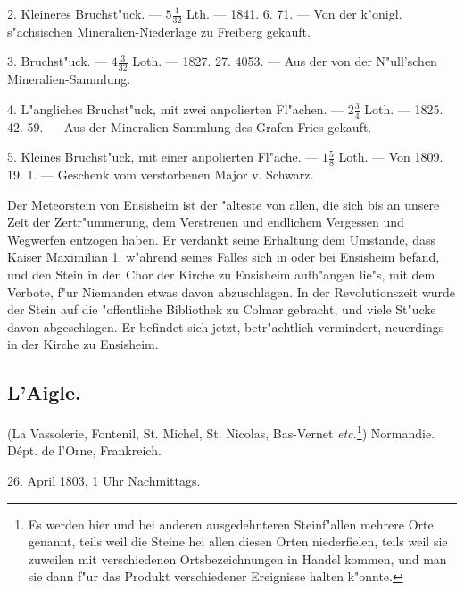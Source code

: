 \documentclass[a4paper, 11pt, oneside, polutonikogreek, german]{article}
\begin{document}
2. Kleineres Bruchst"uck. --- $5\frac{1}{32}$ Lth. --- 1841. 6. 71. --- Von der k"onigl. s"achsischen Mineralien-Niederlage zu Freiberg gekauft.

3. Bruchst"uck. --- $4\frac{3}{32}$ Loth. --- 1827. 27. 4053.
--- Aus der von der N"ull’schen Mineralien-Sammlung.

4. L"angliches Bruchst"uck, mit zwei anpolierten Fl"achen. --- $2\frac{3}{4}$ Loth. --- 1825. 42. 59. --- Aus der Mineralien-Sammlung des Grafen Fries gekauft.

5. Kleines Bruchst"uck, mit einer anpolierten Fl"ache. --- $1\frac{5}{8}$ Loth. --- Von 1809. 19. 1. --- Geschenk vom verstorbenen Major v. Schwarz.

\setlength{\leftskip}{10mm}
\setlength{\parindent}{0pt}

{\footnotesize Der Meteorstein von Ensisheim ist der "alteste von allen, die sich bis an unsere Zeit der Zertr"ummerung, dem Verstreuen und endlichem Vergessen und Wegwerfen entzogen haben. Er verdankt seine Erhaltung dem Umstande, dass Kaiser Maximilian 1. w"ahrend seines Falles sich in oder bei Ensisheim befand, und den Stein in den Chor der Kirche zu Ensisheim aufh"angen lie"s, mit dem Verbote, f"ur Niemanden etwas davon abzuschlagen. In der Revolutionszeit wurde der Stein auf die "offentliche Bibliothek zu Colmar gebracht, und viele St"ucke davon abgeschlagen. Er befindet sich jetzt, betr"achtlich vermindert, neuerdings in der Kirche zu Ensisheim.}

\setlength{\leftskip}{0pt}
\setlength{\parindent}{20pt}

\subsection{L'Aigle.}
\begin{center}
\small
(La Vassolerie, Fontenil, St. Michel, St. Nicolas, Bas-Vernet \emph{etc.}\footnote{Es werden hier und bei anderen ausgedehnteren Steinf"allen mehrere Orte genannt, teils weil die Steine hei allen diesen Orten niederfielen, teils weil sie zuweilen mit verschiedenen Ortsbezeichnungen in Handel kommen, und man sie dann f"ur das Produkt verschiedener Ereignisse halten k"onnte.}) Normandie. Dépt. de l'Orne, Frankreich.

26. April 1803, 1 Uhr Nachmittags.
\end{center}
\end{document}
